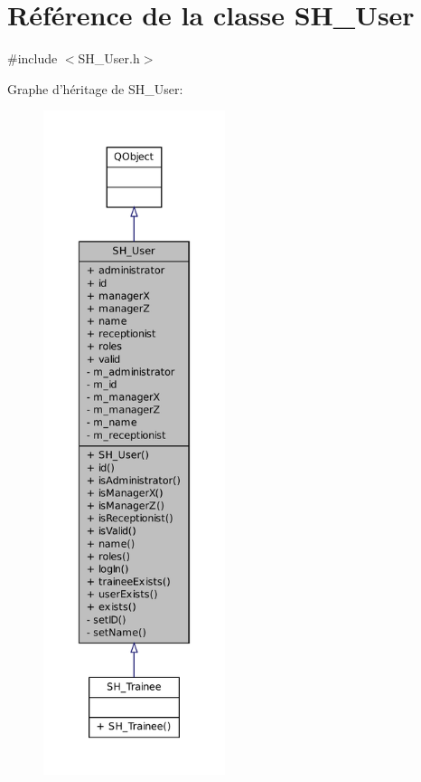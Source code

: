 \hypertarget{classSH__User}{\section{Référence de la classe S\-H\-\_\-\-User}
\label{classSH__User}
}


{\ttfamily \#include $<$S\-H\-\_\-\-User.\-h$>$}



Graphe d'héritage de S\-H\-\_\-\-User\-:\nopagebreak
\begin{figure}[H]
\begin{center}
\leavevmode
\includegraphics[height=550pt]{classSH__User__inherit__graph}
\end{center}
\end{figure}


